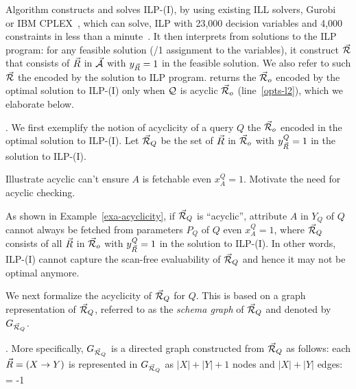 {\vspace{0.8ex}
Algorithm \opts constructs and solves ILP-(I), 
by using existing ILL solvers, \eg Gurobi~\cite{gurobi} or
IBM CPLEX~\cite{cplex}, which can solve, \eg ILP 
with 23,000 decision variables and 4,000  constraints
in less than a minute~\cite{ILPstat}.
%
It then interprets \bdss from solutions to the ILP
program: for any feasible solution (/1 assignment to the
variables), it construct \bds $\vec{{\mathcal R}}$ that consists of \bss
$\vec{R}$ in $\vec{{\mathcal A}}$ with $y_{\vec{R}}  = 1$ in the feasible
solution. We also refer to such $\vec{{\mathcal R}}$ the \bds encoded by the
solution to ILP program. \opts returns the \bds
$\vec{{\mathcal R}}_{o}$ encoded by the optimal solution to ILP-(I) only
when $\mathcal Q$ is acyclic \wrt $\vec{{\mathcal R}}_{o}$ (line~\ref{opts-l2}), which we elaborate below. 



. We first exemplify the notion
of acyclicity of a query $Q$ \wrt the \bds $\vec{{\mathcal R}}_{o}$ encoded
in the optimal solution to ILP-(I). Let $\vec{{\mathcal R}}_{Q}$ be the set
of \bss $\vec{R}$ in $\vec{{\mathcal R}}_{o}$ with $y_{\vec{R}}^{Q} = 1$ in
the solution to ILP-(I).


\begin{example}\label{exa-acyclicity}
Illustrate acyclic \bs can't ensure $A$ is fetchable even
$x_{A}^{Q} = 1$. Motivate the need for acyclic checking.
\end{example}

As shown in Example~\ref{exa-acyclicity}, if $\vec{{\mathcal R}}_{Q}$ is
``acyclic'', attribute $A$ in $Y_{Q}$ of $Q$ cannot always be
fetched from parameters $P_{Q}$ of $Q$ even $x_{A}^{Q} = 1$,
where $\vec{{\mathcal R}}_{Q}$ consists of all \bss $\vec{R}$ in $\vec{{\mathcal R}}_{o}$
with $y_{\vec{R}}^{Q} = 1$ in the solution to ILP-(I).
In other words, ILP-(I) cannot capture the scan-free
evaluability of $\vec{{\mathcal R}}_{Q}$ and hence it may not be optimal anymore. 


We next formalize the acyclicity of \bds $\vec{{\mathcal R}}_{Q}$ for $Q$.
This is based on a graph representation of $\vec{{\mathcal R}}_{Q}$, referred to
as the {\em schema graph} of $\vec{{\mathcal R}}_{Q}$ and denoted by
$G_{\vec{{\mathcal R}}_{Q}}$.


. More specifically, $G_{\vec{{\mathcal R}}_{Q}}$ is a
directed graph constructed from $\vec{{\mathcal R}}_{Q}$ as follows: each \bs
$\vec{R} = (X\rightarrow Y)$ is represented in $G_{\vec{{\mathcal R}}_{Q}}$ as $|X|+|Y|+1$
nodes and $|X|+|Y|$ edges:
\looseness = -1

}
